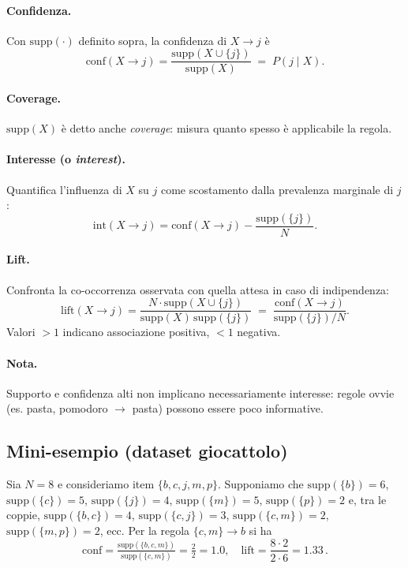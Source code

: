 \paragraph{Confidenza.} Con $\mathrm{supp}(\cdot)$ definito sopra, la confidenza di $X\to j$ è
\[
\mathrm{conf}(X\to j) = \frac{\mathrm{supp}(X\cup\{j\})}{\mathrm{supp}(X)} \;=\; P(j\mid X).\label{eq:confidence}
\]
\paragraph{Coverage.} $\mathrm{supp}(X)$ è detto anche \emph{coverage}: misura quanto spesso è applicabile la regola.
\paragraph{Interesse (o \emph{interest}).} Quantifica l'influenza di $X$ su $j$ come scostamento dalla prevalenza marginale di $j$:
\[
\mathrm{int}(X\to j) = \mathrm{conf}(X\to j) - \frac{\mathrm{supp}(\{j\})}{N}.
\]
\paragraph{Lift.} Confronta la co-occorrenza osservata con quella attesa in caso di indipendenza:
\[
\mathrm{lift}(X\to j) = \frac{N\cdot\mathrm{supp}(X\cup\{j\})}{\mathrm{supp}(X)\,\mathrm{supp}(\{j\})} \;=\; \frac{\mathrm{conf}(X\to j)}{\mathrm{supp}(\{j\})/N}.
\]
Valori $>1$ indicano associazione positiva, $<1$ negativa.

\paragraph{Nota.} Supporto e confidenza alti non implicano necessariamente interesse: regole ovvie (es. {pasta, pomodoro} $\to$ {pasta}) possono essere poco informative.

\subsection{Mini-esempio (dataset giocattolo)}\label{subsec:mini-esempio}
Sia $N=8$ e consideriamo item $\{b,c,j,m,p\}$. Supponiamo che $\mathrm{supp}(\{b\})=6$, $\mathrm{supp}(\{c\})=5$, $\mathrm{supp}(\{j\})=4$, $\mathrm{supp}(\{m\})=5$, $\mathrm{supp}(\{p\})=2$ e, tra le coppie, $\mathrm{supp}(\{b,c\})=4$, $\mathrm{supp}(\{c,j\})=3$, $\mathrm{supp}(\{c,m\})=2$, $\mathrm{supp}(\{m,p\})=2$, ecc. Per la regola $\{c,m\}\to b$ si ha
\[
\mathrm{conf}=\tfrac{\mathrm{supp}(\{b,c,m\})}{\mathrm{supp}(\{c,m\})}=\tfrac{2}{2}=1.0,\quad
\mathrm{lift}=\frac{8\cdot 2}{2\cdot 6}=1.33\,.
\]


